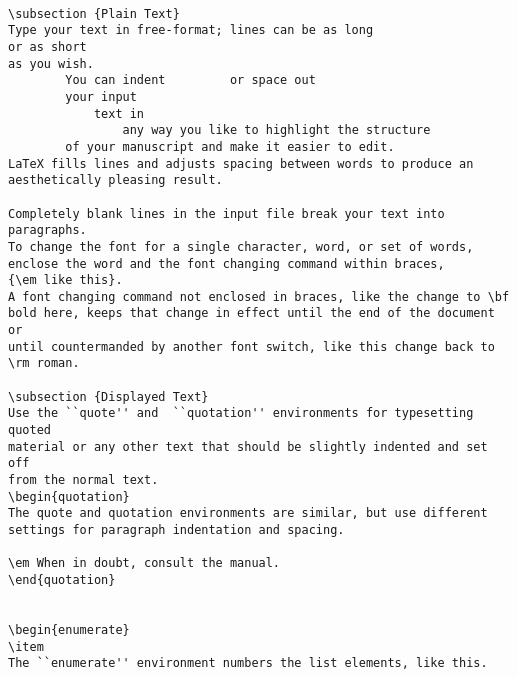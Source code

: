 \documentclass[11pt,oneside]{book}
\begin{document}
\pagebreak
{}
\begin{verbatim}

\subsection {Plain Text}
Type your text in free-format; lines can be as long
or as short
as you wish.
        You can indent         or space out
        your input
            text in
                any way you like to highlight the structure
        of your manuscript and make it easier to edit.
LaTeX fills lines and adjusts spacing between words to produce an
aesthetically pleasing result.

Completely blank lines in the input file break your text into
paragraphs.
To change the font for a single character, word, or set of words,
enclose the word and the font changing command within braces,
{\em like this}.
A font changing command not enclosed in braces, like the change to \bf
bold here, keeps that change in effect until the end of the document or
until countermanded by another font switch, like this change back to
\rm roman.

\subsection {Displayed Text}
Use the ``quote'' and  ``quotation'' environments for typesetting quoted
material or any other text that should be slightly indented and set off
from the normal text.
\begin{quotation}
The quote and quotation environments are similar, but use different
settings for paragraph indentation and spacing.

\em When in doubt, consult the manual.
\end{quotation}


\begin{enumerate}
\item
The ``enumerate'' environment numbers the list elements, like this.


\end{verbatim}
\end{document}
